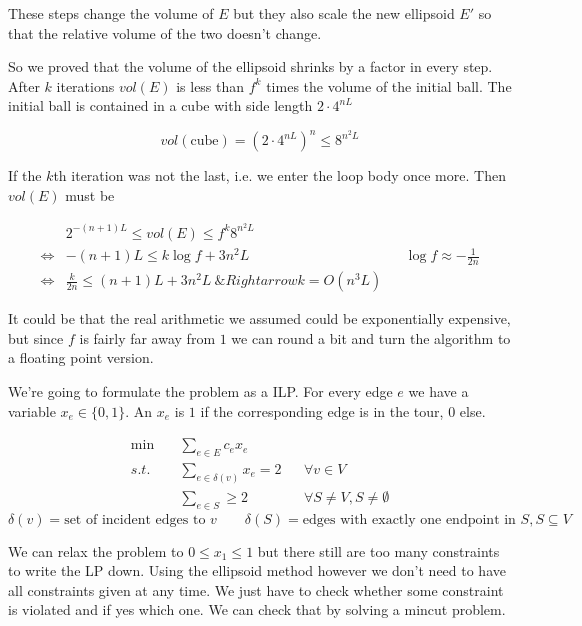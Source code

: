 These steps change the volume of $E$ but they also scale the new ellipsoid $E'$ so that the relative volume of the two doesn't change.

So we proved that the volume of the ellipsoid shrinks by a factor in every step. After $k$ iterations $vol(E)$ is less than $f^k$ times the volume of the initial ball. The initial ball is contained in a cube with side length $2\cdot 4^{nL}$

\[vol(\text{cube}) = (2 \cdot 4^{nL})^n \leq 8^{n^2L}\]

If the $k$th iteration was not the last, i.e. we enter the loop body once more. Then $vol(E)$ must be

\begin{align*}
&2^{-(n+1)L} \leq vol(E) \leq f^k 8^{n^2L} \\
\Leftrightarrow & -(n+1)L  \leq k\log f + 3n^2 L && \log f \approx -\frac{1}{2n}\\
\Leftrightarrow & \frac{k}{2n} \leq (n+1)L+3n^2L \
\&Rightarrow k = O(n^3L)
\end{align*}

It could be that the real arithmetic we assumed could be exponentially expensive, but since $f$ is fairly far away from $1$ we can round a bit and turn the algorithm to a floating point version.

\begin{Ex} We're going to formulate the problem as a ILP. For every edge $e$ we have a variable $x_e\in \{0,1\}$. An $x_e$ is $1$ if the corresponding edge is in the tour, $0$ else.

\begin{align*}
\min \quad & \sum_{e\in E} c_e x_e\\
s.t. & \sum_{e\in \delta(v)} x_e = 2 && \forall v\in V\\
	& \sum_{e\in S} \geq 2 && \forall S\neq V, S\neq \emptyset
\end{align*}
\[\delta(v) = \text{set of incident edges to $v$} \qquad \delta(S) = \text{edges with exactly one endpoint in $S$}, S\subseteq V\]

We can relax the problem to $0\leq x_1 \leq 1$ but there still are too many constraints to write the LP down. Using the ellipsoid method however we don't need to have all constraints given at any time. We just have to check whether some constraint is violated and if yes which one. We can check that by solving a mincut problem.
\end{Ex}
